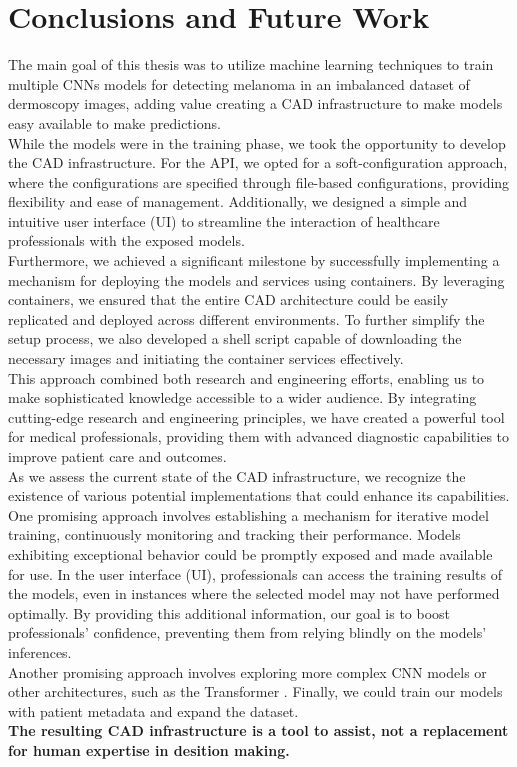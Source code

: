 \section{Conclusions and Future Work}
\label{cap:concl}

The main goal of this thesis was to utilize machine learning techniques to
train multiple CNNs models for detecting melanoma in an imbalanced dataset of
dermoscopy images, adding value creating a CAD infrastructure to make models easy
available to make predictions. \\

While the models were in the training phase, we took the opportunity to develop
the CAD infrastructure. For the API, we opted for a
soft-configuration approach, where the configurations are specified through
file-based configurations, providing flexibility and ease of management.
Additionally, we designed a simple and intuitive user interface (UI) to
streamline the interaction of healthcare professionals with the exposed models.
\\

Furthermore, we achieved a significant milestone by successfully implementing a
mechanism for deploying the models and services using containers. By leveraging
containers, we ensured that the entire CAD architecture could be easily
replicated and deployed across different environments. To further simplify the
setup process, we also developed a shell script capable of downloading the
necessary images and initiating the container services effectively. \\

This approach combined both research and engineering efforts, enabling us to
make sophisticated knowledge accessible to a wider audience. By integrating
cutting-edge research and engineering principles, we have created a powerful
tool for medical professionals, providing them with advanced diagnostic
capabilities to improve patient care and outcomes. \\

As we assess the current state of the CAD infrastructure, we recognize the
existence of various potential implementations that could enhance its
capabilities. One promising approach involves establishing a mechanism for
iterative model training, continuously monitoring and tracking their
performance. Models exhibiting exceptional behavior could be promptly exposed
and made available for use. In the user interface (UI), professionals can
access the training results of the models, even in instances where the selected
model may not have performed optimally. By providing this additional
information, our goal is to boost professionals' confidence, preventing them
from relying blindly on the models' inferences. \\

Another promising approach involves exploring more complex CNN models or other
architectures, such as the Transformer \cite{Transformer}. Finally, we could
train our models with patient metadata and expand the dataset. \\

{\bf The resulting CAD infrastructure is a tool to assist, not a replacement for
human expertise in desition making.}
